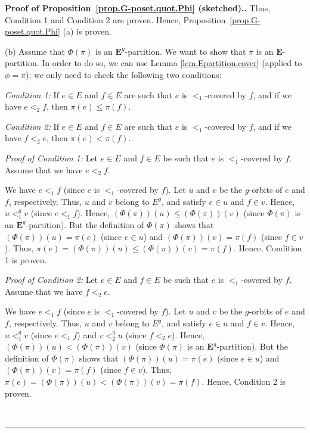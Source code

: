 \documentclass[numbers=enddot,12pt,final,onecolumn,notitlepage,abstracton]{scrartcl}
\theoremstyle{definition}
\newenvironment{proof}[1][Proof]{\noindent\textbf{#1.} }{\ \rule{0.5em}{0.5em}}
\newcommand{\EE}{{\mathbf{E}}}
\begin{document}
\begin{proof}[Proof of Proposition~\ref{prop.G-poset.quot.Phi} (sketched).]
Thus, Condition 1 and Condition 2 are proven. Hence,
Proposition~\ref{prop.G-poset.quot.Phi} (a) is proven.

(b) Assume that $\Phi\left(  \pi\right)  $ is an
$\EE^{g}$-partition. We want to show that $\pi$ is an
$\EE$-partition. In order to do so, we can use
Lemma \ref{lem.Epartition.cover}
(applied to $\phi=\pi$); we only need to check the following two conditions:

\textit{Condition 1:} If $e\in E$ and $f\in E$ are such that $e$ is
$<_{1}$-covered by $f$, and if we have $e<_{2}f$, then
$\pi\left(  e\right)  \leq \pi\left(  f\right)  $.

\textit{Condition 2:} If $e\in E$ and $f\in E$ are such that $e$ is
$<_{1}$-covered by $f$, and if we have $f<_{2}e$, then
$\pi\left(  e\right) <\pi\left(  f\right)  $.

\textit{Proof of Condition 1:} Let $e\in E$ and $f\in E$ be such that $e$ is
$<_{1}$-covered by $f$. Assume that we have $e<_{2}f$.

We have $e<_{1}f$ (since $e$ is $<_{1}$-covered by $f$). Let $u$ and $v$ be
the $g$-orbits of $e$ and $f$, respectively. Thus, $u$ and $v$ belong to
$E^{g}$, and satisfy $e \in u$ and $f \in v$. Hence,
$u<_{1}^g v$ (since $e<_{1}f$). Hence, $\left(  \Phi\left(
\pi\right)  \right)  \left(  u\right)  \leq\left(  \Phi\left(  \pi\right)
\right)  \left(  v\right)  $ (since $\Phi\left(  \pi\right)  $ is an
$\EE^{g}$-partition). But the definition of $\Phi\left(  \pi\right)  $
shows that $\left(  \Phi\left(  \pi\right)  \right)  \left(  u\right)
=\pi\left(  e\right)  $ (since $e\in u$) and $\left(  \Phi\left(  \pi\right)
\right)  \left(  v\right)  =\pi\left(  f\right)  $ (since $f\in v$). Thus,
$\pi\left(  e\right)  =\left(  \Phi\left(  \pi\right)  \right)  \left(
u\right)  \leq\left(  \Phi\left(  \pi\right)  \right)  \left(  v\right)
=\pi\left(  f\right)  $. Hence, Condition 1 is proven.

\textit{Proof of Condition 2:} Let $e\in E$ and $f\in E$ be such that $e$ is
$<_{1}$-covered by $f$. Assume that we have $f<_{2}e$.

We have $e<_{1}f$ (since $e$ is $<_{1}$-covered by $f$). Let $u$ and $v$ be
the $g$-orbits of $e$ and $f$, respectively. Thus, $u$ and $v$ belong to
$E^{g}$, and satisfy $e \in u$ and $f \in v$. Hence,
$u<_{1}^g v$ (since $e<_{1}f$) and $v<_{2}^g u$ (since
$f<_{2}e$). Hence, $\left(  \Phi\left(  \pi\right)  \right)  \left(  u\right)
<\left(  \Phi\left(  \pi\right)  \right)  \left(  v\right)  $ (since
$\Phi\left(  \pi\right)  $ is an $\EE^{g}$-partition). But the
definition of $\Phi\left(  \pi\right)  $ shows that $\left(  \Phi\left(
\pi\right)  \right)  \left(  u\right)  =\pi\left(  e\right)  $ (since $e\in
u$) and $\left(  \Phi\left(  \pi\right)  \right)  \left(  v\right)
=\pi\left(  f\right)  $ (since $f\in v$). Thus, $\pi\left(  e\right)  =\left(
\Phi\left(  \pi\right)  \right)  \left(  u\right)  <\left(  \Phi\left(
\pi\right)  \right)  \left(  v\right)  =\pi\left(  f\right)  $. Hence,
Condition 2 is proven.


\end{proof}
\end{document}
